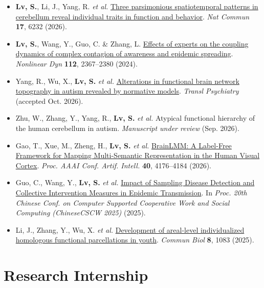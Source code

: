 \documentclass[a4paper,10pt]{article}
\newenvironment{publicationlist}{%
  \small
  \begin{itemize}[
    label=\textbullet,
    leftmargin=1.10em,
    labelsep=0.42em,
    itemsep=0.10em,
    topsep=0.02em,
    parsep=0pt,
    partopsep=0pt
  ]
}{\end{itemize}\vspace{-0.08em}}
\newcommand{\cvpublication}[4]{%
  \item #1 \href{#4}{\textcolor{accent}{#2}}. #3%
}
\newcommand{\cvpublicationnolink}[3]{%
  \item #1 \textcolor{accent}{#2}. #3%
}
\begin{document}
\begin{publicationlist}
  \cvpublication{\textbf{Lv, S.}, Li, J., Yang, R. \textit{et al.}}
    {Three parsimonious spatiotemporal patterns in cerebellum reveal individual traits in function and behavior}
    {\textit{Nat Commun} \textbf{17}, 6232 (2026).}
    {https://doi.org/10.1038/s41467-026-72931-6}

  \cvpublication{\textbf{Lv, S.}, Wang, Y., Guo, C. \& Zhang, L.}
    {Effects of experts on the coupling dynamics of complex contagion of awareness and epidemic spreading}
    {\textit{Nonlinear Dyn} \textbf{112}, 2367--2380 (2024).}
    {https://doi.org/10.1007/s11071-023-09146-7}

  \cvpublication{Yang, R., Wu, X., \textbf{Lv, S.} \textit{et al.}}
    {Alterations in functional brain network topography in autism revealed by normative models}
    {\textit{Transl Psychiatry} (accepted Oct. 2026).}
    {https://doi.org/10.1101/2025.10.23.684286}

  \cvpublicationnolink{Zhu, W., Zhang, Y., Yang, R., \textbf{Lv, S.} \textit{et al.}}
    {Atypical functional hierarchy of the human cerebellum in autism}
    {\textit{Manuscript under review} (Sep. 2026).}

  \cvpublication{Gao, T., Xue, M., Zheng, H., \textbf{Lv, S.} \textit{et al.}}
    {BrainLMM: A Label-Free Framework for Mapping Multi-Semantic Representation in the Human Visual Cortex}
    {\textit{Proc. AAAI Conf. Artif. Intell.} \textbf{40}, 4176--4184 (2026).}
    {https://doi.org/10.1609/aaai.v40i6.42413}

  \cvpublication{Guo, C., Wang, Y., \textbf{Lv, S.} \textit{et al.}}
    {Impact of Sampling Disease Detection and Collective Intervention Measures in Epidemic Transmission}
    {In \textit{Proc. 20th Chinese Conf. on Computer Supported Cooperative Work and Social Computing (ChineseCSCW 2025)} (2025).}
    {https://link.springer.com/book/10.1007/978-981-92-0291-1}

  \cvpublication{Li, J., Zhang, Y., Wu, X. \textit{et al.}}
    {Development of areal-level individualized homologous functional parcellations in youth}
    {\textit{Commun Biol} \textbf{8}, 1083 (2025).}
    {https://doi.org/10.1038/s42003-025-08509-7}

\end{publicationlist}

\section{Research Internship}
\end{document}
